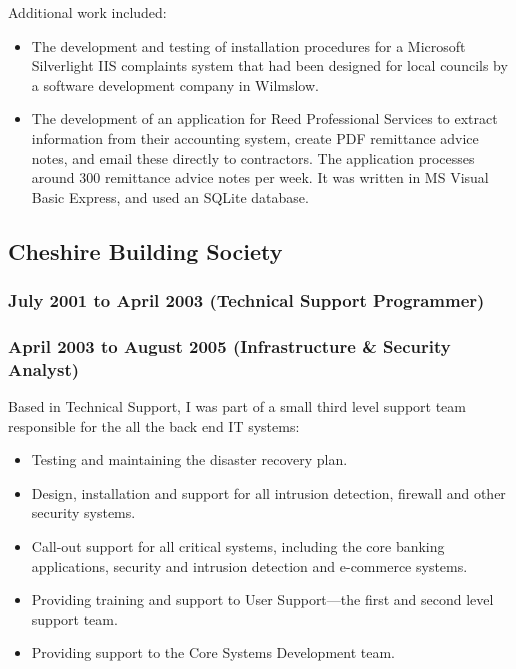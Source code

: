 \documentclass[10pt]{article}
\begin{document}
Additional work included:

\begin{itemize}
    \item The development and testing of installation procedures for a Microsoft
          Silverlight IIS complaints system that had been designed for local councils
          by a software development company in Wilmslow.
    \item The development of an application for Reed Professional Services to extract
          information from their accounting system, create PDF remittance advice notes,
          and email these directly to contractors. The application processes around 300
          remittance advice notes per week.  It was written in MS Visual Basic Express,
          and used an SQLite database.
\end{itemize}

\subsection{Cheshire Building Society}
\subsubsection{July 2001 to April 2003 (Technical Support Programmer)}
\subsubsection{April 2003 to August 2005 (Infrastructure \& Security Analyst)}

Based in Technical Support, I was part of a small third level support team
responsible for the all the back end IT systems:

\begin{itemize}
    \item Testing and maintaining the disaster recovery plan.
    \item Design, installation and support for all intrusion detection, firewall and
          other security systems.
    \item Call-out support for all critical systems, including the core banking
          applications, security and intrusion detection and e-commerce systems.
    \item Providing training and support to User Support---the first and second level
          support team.
    \item Providing support to the Core Systems Development team.
\end{itemize}
\end{document}
